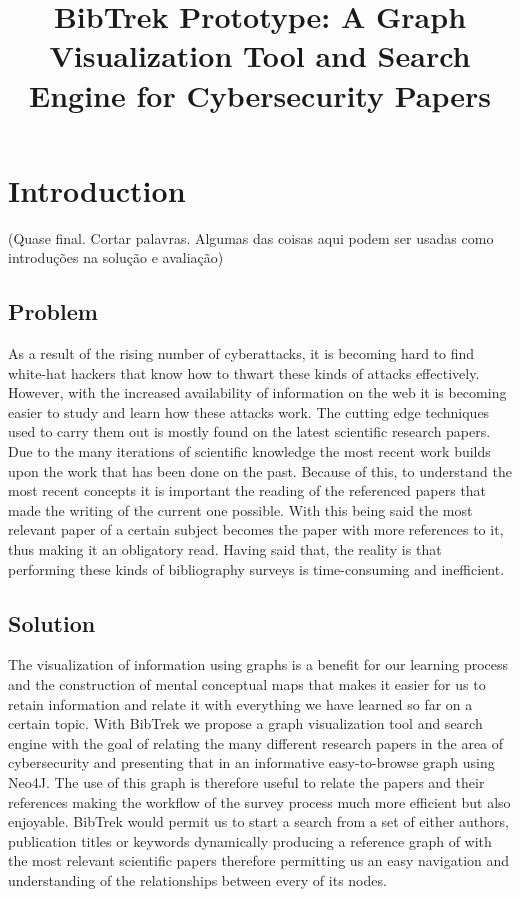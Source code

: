 \documentclass{article}
\begin{document}
\title{\textbf{BibTrek Prototype: A Graph Visualization Tool and Search Engine for Cybersecurity Papers}}
\date{}
\maketitle

\section{Introduction}
(Quase final. Cortar palavras. Algumas das coisas aqui podem ser usadas como introduções na solução e avaliação)
\subsection{Problem}
As a result of the rising number of cyberattacks, it is becoming hard to find white-hat hackers that know how to thwart these kinds of attacks effectively. However, with the increased availability of information on the web it is becoming easier to study and learn how these attacks work. The cutting edge techniques used to carry them out is mostly found on the latest scientific research papers. Due to the many iterations of scientific knowledge the most recent work builds upon the work that has been done on the past. Because of this, to understand the most recent concepts it is important the reading of the referenced papers that made the writing of the current one possible. With this being said the most relevant paper of a certain subject becomes the paper with more references to it, thus making it an obligatory read. Having said that, the reality is that performing these kinds of bibliography surveys is time-consuming and inefficient.

\subsection{Solution}
The visualization of information using graphs is a benefit for our learning process and the construction of mental conceptual maps that makes it easier for us to retain information and relate it with everything we have learned so far on a certain topic.
With BibTrek we propose a graph visualization tool and search engine with the goal of relating the many different research papers in the area of cybersecurity and presenting that in an informative easy-to-browse graph using Neo4J. The use of this graph is therefore useful to relate the papers and their references making the workflow of the survey process much more efficient but also enjoyable. BibTrek would permit us to start a search from a set of either authors, publication titles or keywords dynamically producing a reference graph of with the most relevant scientific papers therefore permitting us an easy navigation and understanding of the relationships between every of its nodes.
\end{document}
